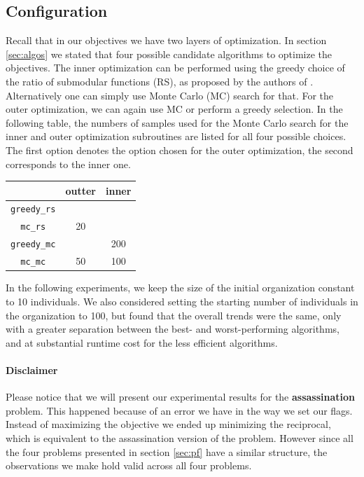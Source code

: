 \subsection{Configuration}

Recall that in our objectives we have two layers of optimization. In section \ref{sec:algos} we stated that four possible candidate algorithms to optimize the objectives. The inner optimization can be performed using the greedy choice of the ratio of submodular functions (RS), as proposed by the authors of \cite{bai2016algorithms}. Alternatively one can simply use Monte Carlo (MC) search for that. For the outer optimization, we can again use MC or perform a greedy selection. In the following table, the numbers of samples used for the Monte Carlo search for the inner and outer optimization subroutines are listed for all four possible choices. The first option denotes the option chosen for the outer optimization, the second corresponds to the inner one.

\begin{center}
    \begin{tabular}{ c|c|c } 
         & outter & inner \\
        \hline
        \texttt{greedy\_rs} &  &  \\
        \texttt{mc\_rs} & 20 &  \\
         \texttt{greedy\_mc} &  & 200 \\
         \texttt{mc\_mc} & 50 & 100 \\
    \end{tabular}
\end{center}

In the following experiments, we keep the size of the initial organization constant to 10 individuals. 
We also considered setting the starting number of individuals in the organization to 100, but found that the overall trends were the same, only with a greater separation between the best- and worst-performing algorithms, and at substantial runtime cost for the less efficient algorithms.

\paragraph*{Disclaimer}

Please notice that we will present our experimental results for the \textbf{assassination} problem. This happened because of an error we have in the way we set our flags. Instead of maximizing the objective we ended up minimizing the reciprocal, which is equivalent to the assassination version of the problem. However since all the four problems presented in section \ref{sec:pf} have a similar structure, the observations we make hold valid across all four problems.

